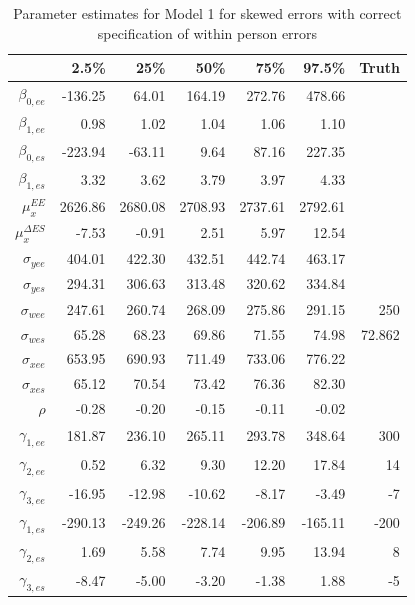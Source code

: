 \documentclass[11pt]{article}\usepackage[]{graphicx}\usepackage[]{color}
\begin{document}
\begin{table}[ht]
\centering
\begin{tabular}{rrrrrr|r}
  \hline
 & 2.5\% & 25\% & 50\% & 75\% & 97.5\% & Truth\\ 
  \hline
$\beta_{0,ee}$ & -136.25 & 64.01 & 164.19 & 272.76 & 478.66 \\ 
  $\beta_{1,ee}$ & 0.98 & 1.02 & 1.04 & 1.06 & 1.10 \\ 
  $\beta_{0,es}$ & -223.94 & -63.11 & 9.64 & 87.16 & 227.35 \\ 
  $\beta_{1,es}$ & 3.32 & 3.62 & 3.79 & 3.97 & 4.33 \\ 
  $\mu_x^{EE}$ & 2626.86 & 2680.08 & 2708.93 & 2737.61 & 2792.61 \\ 
  $\mu_x^{\Delta ES}$ & -7.53 & -0.91 & 2.51 & 5.97 & 12.54 \\ 
  $\sigma_{yee}$ & 404.01 & 422.30 & 432.51 & 442.74 & 463.17 \\ 
  $\sigma_{yes}$ & 294.31 & 306.63 & 313.48 & 320.62 & 334.84 \\ 
  $\sigma_{wee}$ & 247.61 & 260.74 & 268.09 & 275.86 & 291.15 & 250\\ 
  $\sigma_{wes}$ & 65.28 & 68.23 & 69.86 & 71.55 & 74.98 & 72.862\\ 
  $\sigma_{xee}$ & 653.95 & 690.93 & 711.49 & 733.06 & 776.22 \\ 
  $\sigma_{xes}$ & 65.12 & 70.54 & 73.42 & 76.36 & 82.30 \\ 
  $\rho$ & -0.28 & -0.20 & -0.15 & -0.11 & -0.02 \\ 
  $\gamma_{1,ee}$ & 181.87 & 236.10 & 265.11 & 293.78 & 348.64 & 300\\ 
  $\gamma_{2,ee}$ & 0.52 & 6.32 & 9.30 & 12.20 & 17.84 & 14\\ 
  $\gamma_{3,ee}$ & -16.95 & -12.98 & -10.62 & -8.17 & -3.49 & -7\\ 
  $\gamma_{1,es}$ & -290.13 & -249.26 & -228.14 & -206.89 & -165.11 & -200 \\ 
  $\gamma_{2,es}$ & 1.69 & 5.58 & 7.74 & 9.95 & 13.94 & 8 \\ 
  $\gamma_{3,es}$ & -8.47 & -5.00 & -3.20 & -1.38 & 1.88 & -5\\ 
  \hline
   \end{tabular}
\caption{Parameter estimates for Model 1 for skewed errors with correct specification of within person errors}
\label{m1swpestimates}
\end{table}
\end{document}
